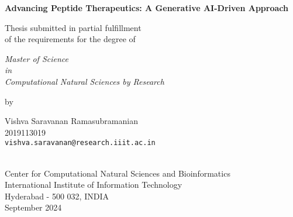 \thispagestyle{empty}
\begin{center}
\vspace*{1.5cm}
{\Large \bf Advancing Peptide Therapeutics: A Generative AI-Driven Approach}

\vspace*{3.75cm}
{\large Thesis submitted in partial fulfillment\\}
{\large  of the requirements for the degree of \\}

\vspace*{1cm}
{\it {\large Master of Science} \\
{\large in\\}
{\large Computational Natural Sciences by Research \\}}

\vspace*{1cm}
{\large by}

\vspace*{5mm}
{\large Vishva Saravanan Ramasubramanian\\}
{\large 2019113019\\
{\small \tt vishva.saravanan@research.iiit.ac.in}}

\vspace*{4.0cm}
{\\}
{\large Center for Computational Natural Sciences and Bioinformatics\\}
{\large International Institute of Information Technology\\}
{\large Hyderabad - 500 032, INDIA\\}
{\large September 2024\\}
\end{center}
